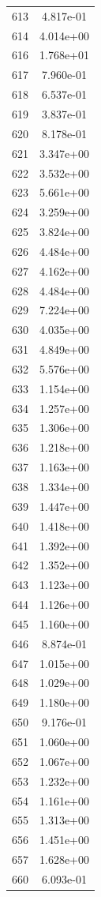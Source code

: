\documentclass[12pt]{article}
\begin{document}
\begin{longtable}{@{}cc@{}}
613 & 4.817e-01 \\
614 & 4.014e+00 \\
616 & 1.768e+01 \\
617 & 7.960e-01 \\
618 & 6.537e-01 \\
619 & 3.837e-01 \\
620 & 8.178e-01 \\
621 & 3.347e+00 \\
622 & 3.532e+00 \\
623 & 5.661e+00 \\
624 & 3.259e+00 \\
625 & 3.824e+00 \\
626 & 4.484e+00 \\
627 & 4.162e+00 \\
628 & 4.484e+00 \\
629 & 7.224e+00 \\
630 & 4.035e+00 \\
631 & 4.849e+00 \\
632 & 5.576e+00 \\
633 & 1.154e+00 \\
634 & 1.257e+00 \\
635 & 1.306e+00 \\
636 & 1.218e+00 \\
637 & 1.163e+00 \\
638 & 1.334e+00 \\
639 & 1.447e+00 \\
640 & 1.418e+00 \\
641 & 1.392e+00 \\
642 & 1.352e+00 \\
643 & 1.123e+00 \\
644 & 1.126e+00 \\
645 & 1.160e+00 \\
646 & 8.874e-01 \\
647 & 1.015e+00 \\
648 & 1.029e+00 \\
649 & 1.180e+00 \\
650 & 9.176e-01 \\
651 & 1.060e+00 \\
652 & 1.067e+00 \\
653 & 1.232e+00 \\
654 & 1.161e+00 \\
655 & 1.313e+00 \\
656 & 1.451e+00 \\
657 & 1.628e+00 \\
660 & 6.093e-01 \\

\end{longtable}
\end{document}
